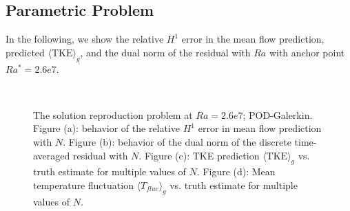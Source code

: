 \subsection{Parametric Problem} In the following, we show the
relative $H^1$ error in the mean flow prediction, predicted
$\langle \text{TKE} \rangle_g$, and the dual norm of the
residual with $Ra$ with anchor point $Ra^*= 2.6e7$.
\begin{figure}[H] \centering 
   \hspace{1.5em}
   \hspace{1.5em}
   \\
   \hspace{1.5em}
\caption{The solution reproduction problem at $Ra=2.6e7$;
   POD-Galerkin. Figure (a): behavior of the relative $H^1$
   error in mean flow prediction with $N$.  Figure (b):
   behavior of the dual norm of the discrete time-averaged
   residual with $N$.
   Figure (c): TKE prediction $\langle \text{TKE} \rangle_g$
   vs. truth estimate for multiple values of $N$.
   Figure (d): Mean temperature fluctuation $\langle T_{fluc}
   \rangle_g$ vs. truth estimate for multiple values of $N$.}
\label{fig:slotr2_ra2.6e7_qois_pmor} \end{figure}
